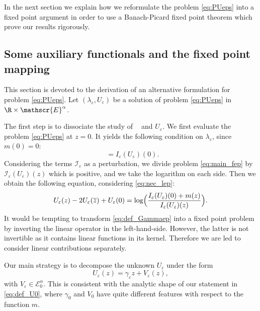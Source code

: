 \documentclass[10pt]{amsart}
\let\mathcal\mathscr
\newcommand{\cI}{\mathcal{I}}
\theoremstyle{plain}
\theoremstyle{definition}
\let\eps\varepsilon
\newcommand{\Ea}{\mathcal{E}^\alpha}
\newcommand{\Eaz}{\mathcal{E}^\alpha_0}
\newcommand{\bz}{\overline{z}}
\DeclareMathOperator{\lep}{\lambda_\varepsilon}
\newcommand{\iep}[1]{I_\varepsilon (U_\varepsilon)(#1)}
\begin{document}
In the next section we explain how we reformulate the problem \eqref{eq:PUeps} into a fixed point argument in order to use a Banach-Picard fixed point theorem which prove our results rigorously.
\subsection{Some auxiliary functionals and the fixed point mapping}\label{eq:formal equivalence}
This section is devoted to the derivation of an alternative formulation for problem \eqref{eq:PUeps}.
Let $(\lambda_\eps, U_\eps)$ be a solution of problem \eqref{eq:PUeps} in $\R \times \Ea $.

The first step is to dissociate the study of $\lep$ and $U_\eps$. We first evaluate the problem \eqref{eq:PUeps} at $z=0$. It yields the following condition on $\lambda_\eps$, since $m(0)=0$:
\begin{equation}\label{eq:nec_lep}
\lep = \iep{0}.
\end{equation}
Considering the terms $\cI_\eps$ as a perturbation, we divide problem \eqref{eq:main_fep} by $\cI_\eps(U_\eps)(z)$ which is positive, and we take the logarithm on each side. Then we obtain the following equation, considering \eqref{eq:nec_lep}:
\begin{equation}\label{eq:def_Gammaep}
U_\eps(z)-2U_\eps(\bz)+U_\eps(0) = \log \Bigl(\dfrac{\iep{0}+ m(z)}{\iep{z}} \Bigr).
\end{equation}
It would be tempting to transform \eqref{eq:def_Gammaep} into a fixed point problem by inverting the linear operator in the left-hand-side. However, the latter is not invertible as it contains linear functions in its kernel. Therefore we are led to consider linear contributions separately.

Our main strategy is to decompose the unknown $U_\eps$ under the form
\begin{equation}\label{eq:necshape Ueps}
U_\eps (z) = \gamma_\eps z + V_\eps(z),
\end{equation}
with $V_\eps \in \Eaz$. This is consistent with the analytic shape of our statement in \eqref{eq:def_U0}, where $\gamma_0$ and $V_0$ have quite different features with respect to the function $m$.
\end{document}
